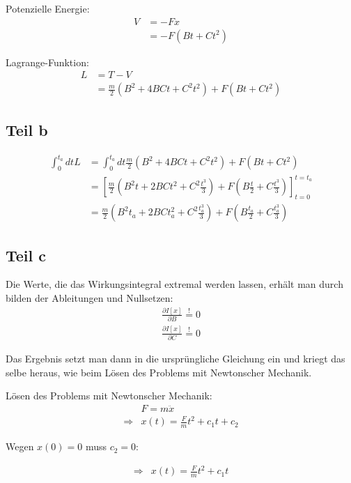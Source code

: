 \documentclass[a4paper,german,12pt,smallheadings]{scrartcl}
\begin{document}
Potenzielle Energie:
\begin{align*}
  V &= -Fx \\
    &= -F(Bt+Ct^2)
\end{align*}

Lagrange-Funktion:
\begin{align*}
  L &= T - V \\
    &= \frac{m}{2} (B^2 + 4BCt + C^2t^2) + F(Bt+Ct^2)
\end{align*}

\subsection*{Teil b}
\begin{align*}
  \int_0^{t_a} dt L &= \int_0^{t_a} dt \frac{m}{2} (B^2 + 4BCt + C^2t^2) + F(Bt+Ct^2) \\
                  &= \left[\frac{m}{2} \left(B^2t + 2BCt^2 + C^2\frac{t^3}{3}\right) + F\left(B\frac{t}{2}+C\frac{t^3}{3}\right)\right]_{t=0}^{t=t_a} \\
                  &= \frac{m}{2} \left(B^2t_a + 2BCt_a^2 + C^2\frac{t_a^3}{3}\right) + F\left(B\frac{t_a}{2}+C\frac{t_a^3}{3}\right)
\end{align*}

\subsection*{Teil c}
Die Werte, die das Wirkungsintegral extremal werden lassen, erhält man durch bilden der Ableitungen und Nullsetzen:
\begin{align*}
  \frac{\partial I[x]}{\partial B} \overset{!}{=} 0 \\
  \frac{\partial I[x]}{\partial C} \overset{!}{=} 0
\end{align*}

Das Ergebnis setzt man dann in die ursprüngliche Gleichung ein und kriegt das
selbe heraus, wie beim Lösen des Problems mit Newtonscher Mechanik.

Lösen des Problems mit Newtonscher Mechanik:
\begin{align*}
  &F = m\ddot{x} \\
  \Rightarrow & x(t) = \frac{F}{m}t^2 + c_1t + c_2
\end{align*}

Wegen $x(0) = 0$ muss $c_2 = 0$:

\begin{align*}
  \Rightarrow & x(t) = \frac{F}{m}t^2 + c_1t
\end{align*}
\end{document}
